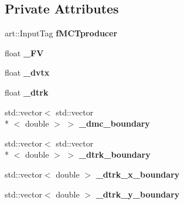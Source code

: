 \subsection*{Private Attributes}
\begin{DoxyCompactItemize}
\item 
\hypertarget{classanalysis_1_1ContainmentAnalysis_aeb708c6457c1a19e63dedc84afad8b94}{art\-::\-Input\-Tag {\bfseries f\-M\-C\-Tproducer}}\label{classanalysis_1_1ContainmentAnalysis_aeb708c6457c1a19e63dedc84afad8b94}

\item 
\hypertarget{classanalysis_1_1ContainmentAnalysis_a3ecb4264e53ae9f996a7689ae8f78541}{float {\bfseries \-\_\-\-F\-V}}\label{classanalysis_1_1ContainmentAnalysis_a3ecb4264e53ae9f996a7689ae8f78541}

\item 
\hypertarget{classanalysis_1_1ContainmentAnalysis_a933f497a05e85666d7e10394dc51aacd}{float {\bfseries \-\_\-dvtx}}\label{classanalysis_1_1ContainmentAnalysis_a933f497a05e85666d7e10394dc51aacd}

\item 
\hypertarget{classanalysis_1_1ContainmentAnalysis_a08c17ce66b43feddb596a78202de032c}{float {\bfseries \-\_\-dtrk}}\label{classanalysis_1_1ContainmentAnalysis_a08c17ce66b43feddb596a78202de032c}

\item 
\hypertarget{classanalysis_1_1ContainmentAnalysis_a927f6f2785545fa4cefa315c23cd1088}{std\-::vector$<$ std\-::vector\\*
$<$ double $>$ $>$ {\bfseries \-\_\-dmc\-\_\-boundary}}\label{classanalysis_1_1ContainmentAnalysis_a927f6f2785545fa4cefa315c23cd1088}

\item 
\hypertarget{classanalysis_1_1ContainmentAnalysis_a1f4ccec0a22555c68eccf5c4295c315c}{std\-::vector$<$ std\-::vector\\*
$<$ double $>$ $>$ {\bfseries \-\_\-dtrk\-\_\-boundary}}\label{classanalysis_1_1ContainmentAnalysis_a1f4ccec0a22555c68eccf5c4295c315c}

\item 
\hypertarget{classanalysis_1_1ContainmentAnalysis_a6b60b98bd35ca4696dd9390dc699f393}{std\-::vector$<$ double $>$ {\bfseries \-\_\-dtrk\-\_\-x\-\_\-boundary}}\label{classanalysis_1_1ContainmentAnalysis_a6b60b98bd35ca4696dd9390dc699f393}

\item 
\hypertarget{classanalysis_1_1ContainmentAnalysis_aa26415fec19cb70a4e8fafac9edb7d23}{std\-::vector$<$ double $>$ {\bfseries \-\_\-dtrk\-\_\-y\-\_\-boundary}}\label{classanalysis_1_1ContainmentAnalysis_aa26415fec19cb70a4e8fafac9edb7d23}


\end{DoxyCompactItemize}
